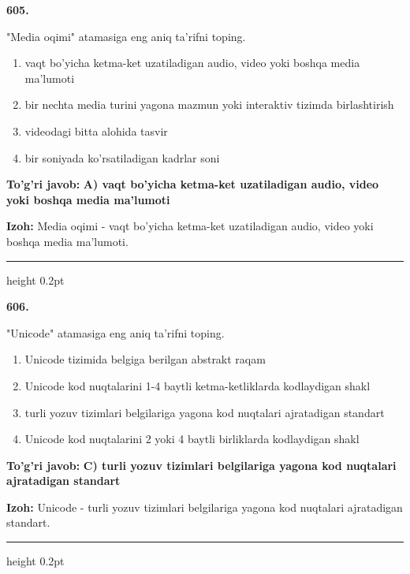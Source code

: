\documentclass[10pt,a4paper,oneside]{article}
\begin{document}
\noindent\textbf{\color{ink}605.}
\par
"Media oqimi" atamasiga eng aniq ta'rifni toping.
\begin{enumerate}[label=\Alph*),leftmargin=9mm]
\item vaqt bo'yicha ketma-ket uzatiladigan audio, video yoki boshqa media ma'lumoti
\item bir nechta media turini yagona mazmun yoki interaktiv tizimda birlashtirish
\item videodagi bitta alohida tasvir
\item bir soniyada ko'rsatiladigan kadrlar soni
\end{enumerate}
\begin{tcolorbox}[enhanced,breakable,colback=teal!4,colframe=teal!50!black,boxrule=0.5pt,arc=1.1mm,left=3mm,right=3mm,top=1.7mm,bottom=1.7mm,before skip=2mm,after skip=2mm]
\textbf{\color{teal}To'g'ri javob:} \textbf{A) vaqt bo'yicha ketma-ket uzatiladigan audio, video yoki boshqa media ma'lumoti}
\par\smallskip
\textbf{Izoh:} Media oqimi - vaqt bo'yicha ketma-ket uzatiladigan audio, video yoki boshqa media ma'lumoti.
\end{tcolorbox}
\vspace{2mm}\hrule height 0.2pt \vspace{3mm}

\noindent\textbf{\color{ink}606.}
\par
"Unicode" atamasiga eng aniq ta'rifni toping.
\begin{enumerate}[label=\Alph*),leftmargin=9mm]
\item Unicode tizimida belgiga berilgan abstrakt raqam
\item Unicode kod nuqtalarini 1-4 baytli ketma-ketliklarda kodlaydigan shakl
\item turli yozuv tizimlari belgilariga yagona kod nuqtalari ajratadigan standart
\item Unicode kod nuqtalarini 2 yoki 4 baytli birliklarda kodlaydigan shakl
\end{enumerate}
\begin{tcolorbox}[enhanced,breakable,colback=teal!4,colframe=teal!50!black,boxrule=0.5pt,arc=1.1mm,left=3mm,right=3mm,top=1.7mm,bottom=1.7mm,before skip=2mm,after skip=2mm]
\textbf{\color{teal}To'g'ri javob:} \textbf{C) turli yozuv tizimlari belgilariga yagona kod nuqtalari ajratadigan standart}
\par\smallskip
\textbf{Izoh:} Unicode - turli yozuv tizimlari belgilariga yagona kod nuqtalari ajratadigan standart.
\end{tcolorbox}
\vspace{2mm}\hrule height 0.2pt \vspace{3mm}
\end{document}
